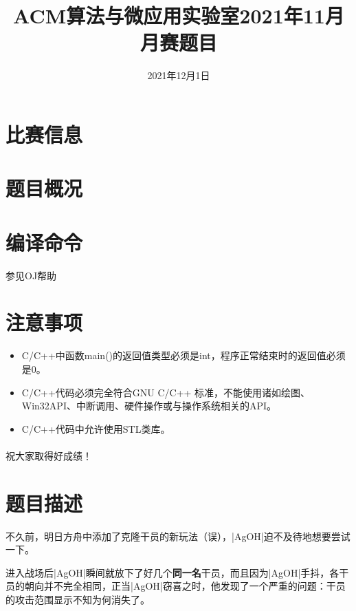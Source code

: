 \documentclass{ctpro}
\title{ACM算法与微应用实验室2021年11月月赛题目}
\date{2021年12月1日}
\begin{document}
\maketitle
{}

\section*{比赛信息}

\section*{题目概况}
\problemtab

\section*{编译命令}
参见OJ帮助

\section*{注意事项}
\begin{itemize}
	\item C/C++中函数main()的返回值类型必须是int，程序正常结束时的返回值必须是0。
	\item C/C++代码必须完全符合GNU C/C++ 标准，不能使用诸如绘图、Win32API、中断调用、硬件操作或与操作系统相关的API。
	\item C/C++代码中允许使用STL类库。
\end{itemize}

\paragraph*{} 祝大家取得好成绩！

\MakeShortVerb{\|}
\makeproblem
\section*{题目描述}
不久前，明日方舟中添加了克隆干员的新玩法（误），|AgOH|迫不及待地想要尝试一下。

进入战场后|AgOH|瞬间就放下了好几个\textbf{同一名}干员，而且因为|AgOH|手抖，各干员的朝向并不完全相同，正当|AgOH|窃喜之时，他发现了一个严重的问题：干员的攻击范围显示不知为何消失了。
\end{document}
